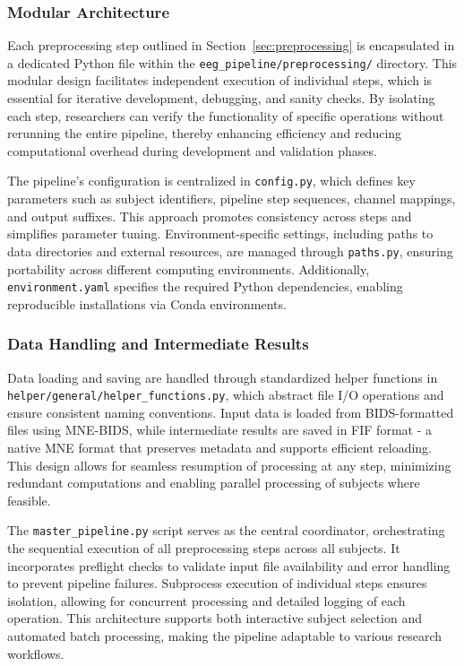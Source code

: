 \documentclass{article}
\theoremstyle{plain}
\theoremstyle{definition}
\theoremstyle{remark}
\begin{document}
\subsubsection{Modular Architecture}

Each preprocessing step outlined in Section~\ref{sec:preprocessing} is encapsulated in a dedicated Python file within the \texttt{eeg\_pipeline/preprocessing/} directory. This modular design facilitates independent execution of individual steps, which is essential for iterative development, debugging, and sanity checks. By isolating each step, researchers can verify the functionality of specific operations without rerunning the entire pipeline, thereby enhancing efficiency and reducing computational overhead during development and validation phases.

The pipeline's configuration is centralized in \texttt{config.py}, which defines key parameters such as subject identifiers, pipeline step sequences, channel mappings, and output suffixes. This approach promotes consistency across steps and simplifies parameter tuning. Environment-specific settings, including paths to data directories and external resources, are managed through \texttt{paths.py}, ensuring portability across different computing environments. Additionally, \texttt{environment.yaml} specifies the required Python dependencies, enabling reproducible installations via Conda environments.

\subsubsection{Data Handling and Intermediate Results}

Data loading and saving are handled through standardized helper functions in \texttt{helper/general/helper\_functions.py}, which abstract file I/O operations and ensure consistent naming conventions. Input data is loaded from BIDS-formatted files using MNE-BIDS, while intermediate results are saved in FIF format - a native MNE format that preserves metadata and supports efficient reloading. This design allows for seamless resumption of processing at any step, minimizing redundant computations and enabling parallel processing of subjects where feasible.

The \texttt{master\_pipeline.py} script serves as the central coordinator, orchestrating the sequential execution of all preprocessing steps across all subjects. It incorporates preflight checks to validate input file availability and error handling to prevent pipeline failures. Subprocess execution of individual steps ensures isolation, allowing for concurrent processing and detailed logging of each operation. This architecture supports both interactive subject selection and automated batch processing, making the pipeline adaptable to various research workflows.
\end{document}
